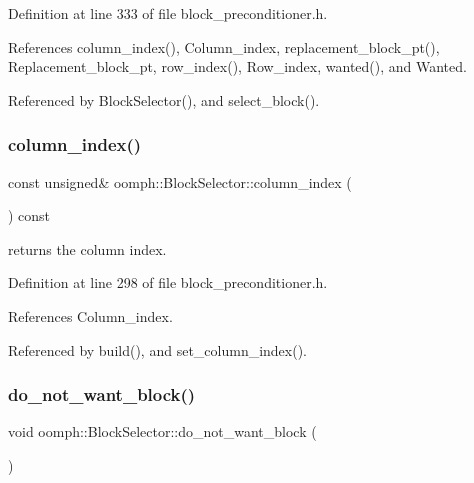 Definition at line 333 of file block\+\_\+preconditioner.\+h.



References column\+\_\+index(), Column\+\_\+index, replacement\+\_\+block\+\_\+pt(), Replacement\+\_\+block\+\_\+pt, row\+\_\+index(), Row\+\_\+index, wanted(), and Wanted.



Referenced by Block\+Selector(), and select\+\_\+block().

\mbox{\label{classoomph_1_1BlockSelector_a2b18303d1dfdfe5aeee43fc9a5452f5c}} 
\subsubsection{\texorpdfstring{column\+\_\+index()}{column\_index()}}
{\footnotesize\ttfamily const unsigned\& oomph\+::\+Block\+Selector\+::column\+\_\+index (\begin{DoxyParamCaption}{ }\end{DoxyParamCaption}) const\hspace{0.3cm}{\ttfamily [inline]}}



returns the column index. 



Definition at line 298 of file block\+\_\+preconditioner.\+h.



References Column\+\_\+index.



Referenced by build(), and set\+\_\+column\+\_\+index().

\mbox{\label{classoomph_1_1BlockSelector_a2548e42fd02e258d46d0a4f74919f11a}} 
\subsubsection{\texorpdfstring{do\+\_\+not\+\_\+want\+\_\+block()}{do\_not\_want\_block()}}
{\footnotesize\ttfamily void oomph\+::\+Block\+Selector\+::do\+\_\+not\+\_\+want\+\_\+block (\begin{DoxyParamCaption}{ }\end{DoxyParamCaption})\hspace{0.3cm}{\ttfamily [inline]}}



